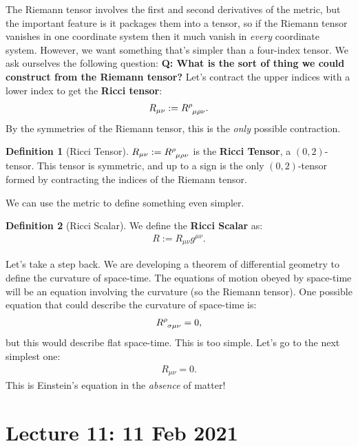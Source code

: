 \documentclass[11pt]{article}
\newcommand{\riemanntensor}[0]{\tensor{R}{^\rho_{\sigma \mu \nu}}}
\theoremstyle{definition}
\newtheorem{definition}{Definition}[section]
\begin{document}
The Riemann tensor involves the first and second derivatives of the metric, but the important feature is it packages them into a tensor, so if the Riemann tensor vanishes in one coordinate system then it much vanish in \emph{every} coordinate system. However, we want something that's simpler than a four-index tensor. We ask ourselves the following question: \textbf{Q: What is the sort of thing we could construct from the Riemann tensor?} Let's contract the upper indices with a lower index to get the \textbf{Ricci tensor}:
\begin{align}
	R_{\mu \nu} := \tensor{R}{^\rho_{\mu \rho \nu}}.
\end{align}
By the symmetries of the Riemann tensor, this is the \emph{only} possible contraction. 
\begin{definition}[Ricci Tensor]
	\( R_{\mu \nu} := \tensor{R}{^\rho_{\mu \rho \nu}} \) is the \textbf{Ricci Tensor}, a \( (0,2) \)-tensor. This tensor is symmetric, and up to a sign is the only \( (0,2) \)-tensor formed by contracting the indices of the Riemann tensor. 
\end{definition}
We can use the metric to define something even simpler.
\begin{definition}[Ricci Scalar]
	We define the \textbf{Ricci Scalar} as:
	\begin{align}
		R := R_{\mu \nu} g^{\mu \nu}.	
	\end{align}
\end{definition}
Let's take a step back. We are developing a theorem of differential geometry to define the curvature of space-time. The equations of motion obeyed by space-time will be an equation involving the curvature (so the Riemann tensor). One possible equation that could describe the curvature of space-time is: 
\begin{align*}
	\riemanntensor = 0, 
\end{align*}
but this would describe flat space-time. This is too simple. Let's go to the next simplest one: 
\begin{align*}
	R_{\mu \nu} = 0.
\end{align*}
This is Einstein's equation in the \emph{absence} of matter!

\section{Lecture 11: 11 Feb 2021}
\end{document}
